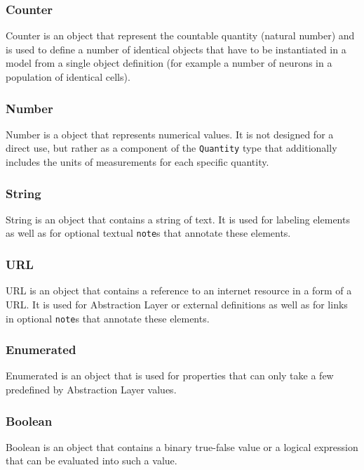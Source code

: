 \documentclass{article}
\begin{document}
\subsubsection{Counter}

Counter is an object that represent the countable quantity (natural
number) and is used to define a number of identical objects that have
to be instantiated in a model from a single object definition (for
example a number of neurons in a population of identical cells).

\subsubsection{Number}

Number is a object that represents numerical values. It is not designed for
a direct use, but rather as a component of the {\tt Quantity} type that
additionally includes the units of measurements for each specific quantity.

\subsubsection{String}

String is an object that contains a string of text. It is used for labeling
elements as well as for optional textual {\tt note}s that annotate these
elements.

\subsubsection{URL}

URL is an object that contains a reference to an internet resource in a form
of a URL. It is used for Abstraction Layer or external definitions as well as
for links in optional {\tt note}s that annotate these elements.

\subsubsection{Enumerated}

Enumerated is an object that is used for properties that can only take
a few predefined by Abstraction Layer values.

\subsubsection{Boolean}

Boolean is an object that contains a binary true-false value or a logical
expression that can be evaluated into such a value.
\end{document}
